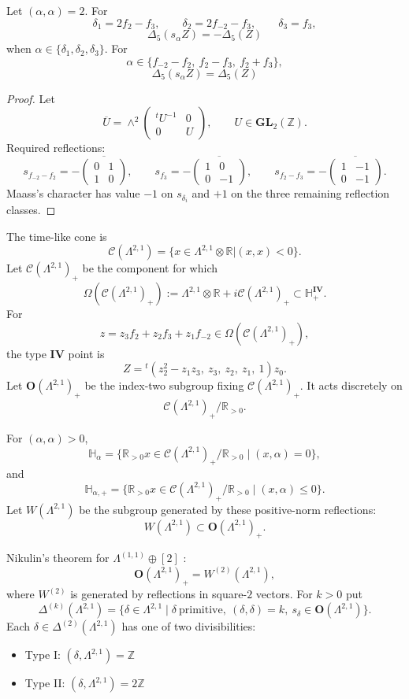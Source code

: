 \documentclass[11pt]{memoir}
\newcommand{\Z}{\mathbb{Z}} \newcommand{\C}{\mathbb{C}}
\newcommand{\R}{\mathbb{R}} \newcommand{\La}{\Lambda}
\newcommand{\HypPlan}{\Lambda^{(1,1)}}
\newcommand{\GL}{\mathbf{GL}}
\newcommand{\Orth}{\mathbf{O}}
\newcommand{\Hpl}{\mathbb{H}}
\newcommand{\IV}{\mathbf{IV}}
\newcommand{\Cone}{\mathcal{C}}
\begin{document}
\begin{lemma}
Let $(\alpha,\alpha)=2$.  For
$$\delta_1=2f_2-f_3,\qquad
\delta_2=2f_{-2}-f_3,\qquad
\delta_3=f_3,$$
$$\Delta_5(s_{\alpha}Z) = - \Delta_5(Z)$$
when $\alpha\in\{\delta_1,\delta_2,\delta_3\}$.  For
$$\alpha\in\{f_{-2}-f_2,\ f_2-f_3,\ f_2+f_3\},$$
$$\Delta_5(s_{\alpha}Z) = \Delta_5(Z)$$
\end{lemma}
\begin{proof}
Let
$$\overline U=\wedge^2\begin{pmatrix}{}^tU^{-1}&0\\0&U\end{pmatrix},
\qquad U\in\GL_2(\Z).$$
Required reflections:
$$s_{f_{-2}-f_2}=-\overline{\begin{pmatrix}0&1\\1&0\end{pmatrix}},
\qquad
s_{f_3}=-\overline{\begin{pmatrix}1&0\\0&-1\end{pmatrix}},
\qquad
s_{f_2-f_3}=-\overline{\begin{pmatrix}1&-1\\0&-1\end{pmatrix}}.$$
Maass's character has value $-1$ on
$s_{\delta_i}$ and $+1$ on the three remaining reflection classes.
\end{proof}

\noindent The time-like cone is
$$\Cone(\La^{2,1}) = \{ x \in \La^{2,1}
\otimes \R | (x,x) < 0\}.$$
Let $\Cone(\La^{2,1})_+$ be the component for which
$$\Omega(\Cone(\La^{2,1})_+):=
\La^{2,1}\otimes\R+i\Cone(\La^{2,1})_+\subset\Hpl^{\IV}_+.$$
For
$$z=z_3f_2+z_2f_3+z_1f_{-2}\in\Omega(\Cone(\La^{2,1})_+),$$
the type $\IV$ point is
$$Z={}^t(z_2^2-z_1z_3,\ z_3,\ z_2,\ z_1,\ 1)z_0.$$
Let $\Orth(\La^{2,1})_+$ be the index-two subgroup fixing
$\Cone(\La^{2,1})_+$.  It acts discretely on
$$\Cone(\La^{2,1})_+/\R_{>0}.$$

For $(\alpha,\alpha)>0$,
$$\Hpl_{\alpha}=
\{\R_{>0}x\in\Cone(\La^{2,1})_+/\R_{>0}\mid (x,\alpha)=0\},$$
and
$$\Hpl_{\alpha,+}=
\{\R_{>0}x\in\Cone(\La^{2,1})_+/\R_{>0}\mid (x,\alpha)\leq0\}.$$
Let $W(\La^{2,1})$ be the subgroup generated by these positive-norm
reflections:
$$W(\La^{2,1})\subset\Orth(\La^{2,1})_+.$$


Nikulin's theorem for $\HypPlan\oplus[2]$ \cite{NIKULIN}:
$$\Orth(\La^{2,1})_+=W^{(2)}(\La^{2,1}),$$
where $W^{(2)}$ is generated by reflections in square-$2$ vectors.
For $k>0$ put
$$\Delta^{(k)}(\La^{2,1})=
\{\delta\in\La^{2,1}\mid \delta\ \text{primitive},\
(\delta,\delta)=k,\ s_\delta\in\Orth(\La^{2,1})\}.$$
Each $\delta\in\Delta^{(2)}(\La^{2,1})$ has one of two divisibilities:
\begin{itemize}
\item Type I: $(\delta, \La^{2,1}) = \Z$
\item Type II: $(\delta, \La^{2,1}) = 2\Z$
\end{itemize}
\end{document}
